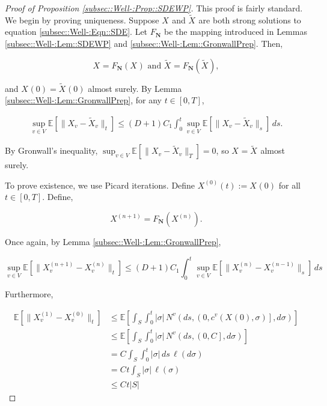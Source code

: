 \documentclass[12pt]{article}
\newcommand{\skipLine}{\vspace{12pt}}
\newcommand{\mb}{\mathbb}
\newcommand{\te}{\text}
\newcommand{\ex}[1]{\mb{E}\left[#1\right]}			%
\newcommand{\defeq}{:=}								%
\renewcommand{\v}{v}							%
\renewcommand{\S}{S}							%
\newcommand{\s}{\sigma}							%
\newcommand{\T}{T}								%
\renewcommand{\t}{t}							%
\renewcommand{\tt}{s}							%
\newcommand{\X}{X}								%
\newcommand{\IGr}{c}							%
\newcommand{\vind}[1]{^{#1}}					%
\newcommand{\cind}[1]{_{#1}}					%
\newcommand{\tp}[1]{(#1)}						%
\newcommand{\tip}[1]{#1}						%
\newcommand{\const}{C}							%
\newcommand{\degr}{D}							%
\newcommand{\sln}[1]{^{(#1)}}					%
\newcommand{\poisses}{\mathbf{N}}				%
\newcommand{\poiss}{N}							%
\newcommand{\Sm}{\ell}							%
\newcommand{\Fpo}{F_{\poisses}}					%
\newcommand{\alt}[1]{\widetilde{#1}}			%
\newcommand{\indx}[1]{_{#1}}					%
\begin{document}
\begin{proof}[Proof of Proposition \ref{subsec::Well-:Prop::SDEWP}]

This proof is fairly standard. We begin by proving uniqueness. Suppose \(\X\cind{}\tip{}\) and \(\alt{\X}\cind{}\tip{}\) are both strong solutions to equation \ref{subsec::Well-:Eqn::SDE}. Let \(\Fpo\) be the mapping introduced in Lemmas \ref{subsec::Well-:Lem::SDEWP} and \ref{subsec::Well-:Lem::GronwallPrep}. Then,

\[\X\cind{}\tip{} = \Fpo(\X\cind{}\tip{})\te{ and } \alt{\X}\cind{}\tip{} = \Fpo(\alt{\X}\cind{}\tip{}),\]

and \(\X\cind{}\tp{0} = \alt{\X}\cind{}\tp{0}\) almost surely. By Lemma \ref{subsec::Well-:Lem::GronwallPrep}, for any \(\t\in [0,\T]\),

\begin{align*}
\sup_{\v\in V}\ex{\|\X\cind{\v}\tip{} - \alt{\X}\cind{\v}\tip{}\|_\t} \leq (\degr+1)\const\indx{1}\int_0^\t\sup_{\v\in V} \ex{\|\X\cind{\v}\tip{} - \alt{\X}\cind{\v}\tip{}\|_\tt}\,d\tt.
\end{align*}

By Gronwall's inequality, \(\sup_{\v \in V} \ex{\|\X\cind{\v}\tip{} - \alt{\X}\cind{\v}\tip{}\|_\T} = 0\), so \(\X\cind{}\tip{} = \alt{\X}\cind{}\tip{}\) almost surely.

\skipLine

To prove existence, we use Picard iterations. Define \(\X\sln{0}\cind{}\tp{\t} \defeq \X\cind{}\tp{0}\) for all \(\t \in [0,\T]\). Define,

\[\X\sln{n+1}\cind{}\tip{} = \Fpo(\X\sln{n}\cind{}\tip{}).\]

Once again, by Lemma \ref{subsec::Well-:Lem::GronwallPrep},

\[\sup_{\v \in V} \ex{\|\X\sln{n+1}\cind{\v}\tip{} - \X\sln{n}\cind{\v}\tip{}\|_\t} \leq (\degr+1)\const\indx{1} \int_0^\t \sup_{\v \in V} \ex{\|\X\sln{n}\cind{\v}\tip{} - \X\sln{n-1}\cind{\v}\tip{}\|_\tt}\,d\tt\] 

Furthermore, 

\begin{align*}
\ex{\|\X\sln{1}\cind{\v}\tip{} - \X\sln{0}\cind{\v}\tip{}\|_\t} &\leq \ex{\int_\S\int_0^\t |\s|\,\poiss\vind{\v}\left(d\tt,\left(0,\IGr\vind{\v}(\X\cind{}\tp{0},\s)\right],d\s\right)}\\
&\leq \ex{\int_\S\int_0^\t |\s|\,\poiss\vind{\v}\left(d\tt,\left(0,\const\indx{}\right],d\s\right)}\\
&= \const\indx{}\int_\S\int_0^\t |\s|\,d\tt\,\Sm(d\s)\\
&=\const\indx{}\t\int_\S |\s|\,\Sm(\s)\\
&\leq \const\indx{}\t|\S|
\end{align*}


\end{proof}
\end{document}
